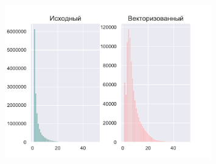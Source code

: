 \begin{figure}[ht]
	\centering
		\includegraphics[width=0.8\textwidth]{./pics/text_4_vec_irreg/hibbard_k_15.pdf}
	\caption{}
	\label{fig:text_4_vec_irreg_hibbard_k_15}
\end{figure}
